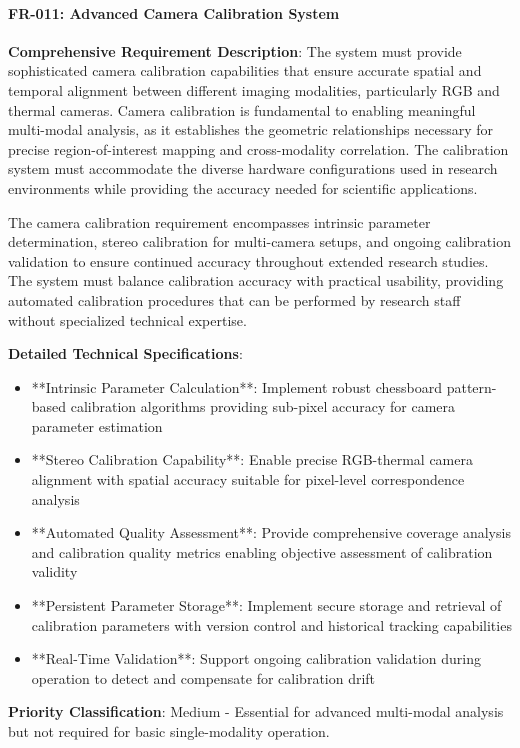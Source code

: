 \documentclass[12pt,a4paper]{report}
\begin{document}
\paragraph{FR-011: Advanced Camera Calibration System}

\textbf{Comprehensive Requirement Description}: The system must provide sophisticated camera calibration capabilities that
ensure accurate spatial and temporal alignment between different imaging modalities, particularly RGB and thermal
cameras. Camera calibration is fundamental to enabling meaningful multi-modal analysis, as it establishes the geometric
relationships necessary for precise region-of-interest mapping and cross-modality correlation. The calibration system
must accommodate the diverse hardware configurations used in research environments while providing the accuracy needed
for scientific applications.

The camera calibration requirement encompasses intrinsic parameter determination, stereo calibration for multi-camera
setups, and ongoing calibration validation to ensure continued accuracy throughout extended research studies. The system
must balance calibration accuracy with practical usability, providing automated calibration procedures that can be
performed by research staff without specialized technical expertise.

\textbf{Detailed Technical Specifications}:

\begin{itemize}
\item **Intrinsic Parameter Calculation**: Implement robust chessboard pattern-based calibration algorithms providing
  sub-pixel accuracy for camera parameter estimation
\item **Stereo Calibration Capability**: Enable precise RGB-thermal camera alignment with spatial accuracy suitable for
  pixel-level correspondence analysis
\item **Automated Quality Assessment**: Provide comprehensive coverage analysis and calibration quality metrics enabling
  objective assessment of calibration validity
\item **Persistent Parameter Storage**: Implement secure storage and retrieval of calibration parameters with version
  control and historical tracking capabilities
\item **Real-Time Validation**: Support ongoing calibration validation during operation to detect and compensate for
  calibration drift

\end{itemize}
\textbf{Priority Classification}: Medium - Essential for advanced multi-modal analysis but not required for basic
single-modality operation.
\end{document}
